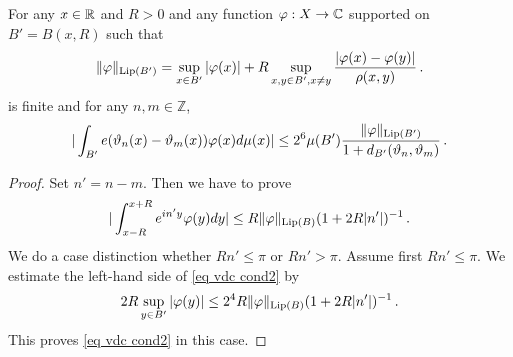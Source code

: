 \begin{lemma}
    For any $x\in \mathbb{R}$ and $R>0$ and any
    function $\varphi: X\to \mathbb{C}$ supported on $B'=B(x,R)$
    such that
\begin{equation}
    \|\varphi\|_{\operatorname{\operatorname{Lip}}(B')} = \sup_{x \in B'} |\varphi(x)| + R \sup_{x,y \in B', x \neq y} \frac{|\varphi(x) - \varphi(y)|}{\rho(x,y)}\,.
\end{equation}
is finite and for any $n,m\in \mathbb{Z}$,
\begin{equation}
    \label{eq vdc cond1}
    |\int_{B'} e(\vartheta_n(x)-{\vartheta_m(x)}) \varphi(x) d\mu(x)|\le 2^6 \mu(B')\frac{\|\varphi\|_{\operatorname{\operatorname{Lip}}(B')}}{1+d_{B'}(\vartheta_n,\vartheta_m)}
\, .
\end{equation}


\end{lemma}
\begin{proof}
Set $n'=n-m$. Then we have to prove
\begin{equation}
    \label{eq vdc cond2}
    |\int_{x-R}^{x+R} e^{in'y}\varphi(y) dy|\le R\|\varphi\|_{\operatorname{\operatorname{Lip}}(B)}
(1+2R|n'|)^{-1}\, .
\end{equation}
We do a case distinction whether $Rn'\le \pi$
or $Rn'> \pi$.
Assume first  $Rn'\le \pi$. We estimate the left-hand side  of \eqref{eq vdc cond2} by
\begin{equation}
    2R\sup_{y\in B'}|\varphi(y)|\le 2^4R\|\varphi\|_{\operatorname{\operatorname{Lip}}(B)}(1+2R|n'|)^{-1}\, .
\end{equation}
This proves \eqref{eq vdc cond2} in this case.


\end{proof}
